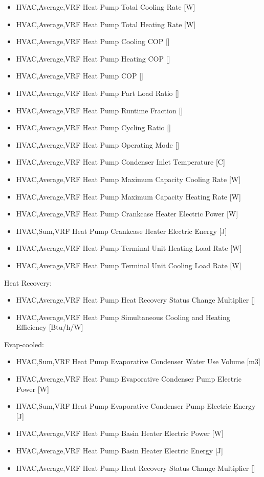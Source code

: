 \begin{itemize}
\item
  HVAC,Average,VRF Heat Pump Total Cooling Rate {[}W{]}
\item
  HVAC,Average,VRF Heat Pump Total Heating Rate {[}W{]}
\item
  HVAC,Average,VRF Heat Pump Cooling COP {[]}
\item
  HVAC,Average,VRF Heat Pump Heating COP {[]}
\item
  HVAC,Average,VRF Heat Pump COP {[]}
\item
  HVAC,Average,VRF Heat Pump Part Load Ratio {[]}
\item
  HVAC,Average,VRF Heat Pump Runtime Fraction {[]}
\item
  HVAC,Average,VRF Heat Pump Cycling Ratio {[]}
\item
  HVAC,Average,VRF Heat Pump Operating Mode {[]}
\item
  HVAC,Average,VRF Heat Pump Condenser Inlet Temperature {[}C{]}
\item
  HVAC,Average,VRF Heat Pump Maximum Capacity Cooling Rate {[}W{]}
\item
  HVAC,Average,VRF Heat Pump Maximum Capacity Heating Rate {[}W{]}
\item
  HVAC,Average,VRF Heat Pump Crankcase Heater Electric Power {[}W{]}
\item
  HVAC,Sum,VRF Heat Pump Crankcase Heater Electric Energy {[}J{]}
\item
  HVAC,Average,VRF Heat Pump Terminal Unit Heating Load Rate {[}W{]}
\item
  HVAC,Average,VRF Heat Pump Terminal Unit Cooling Load Rate {[}W{]}
\end{itemize}

Heat Recovery:

\begin{itemize}
\item
  HVAC,Average,VRF Heat Pump Heat Recovery Status Change Multiplier {[]}
\item
  HVAC,Average,VRF Heat Pump Simultaneous Cooling and Heating Efficiency {[}Btu/h/W{]}
\end{itemize}

Evap-cooled:

\begin{itemize}
\item
  HVAC,Sum,VRF Heat Pump Evaporative Condenser Water Use Volume {[}m3{]}
\item
  HVAC,Average,VRF Heat Pump Evaporative Condenser Pump Electric Power {[}W{]}
\item
  HVAC,Sum,VRF Heat Pump Evaporative Condenser Pump Electric Energy {[}J{]}
\item
  HVAC,Average,VRF Heat Pump Basin Heater Electric Power {[}W{]}
\item
  HVAC,Average,VRF Heat Pump Basin Heater Electric Energy {[}J{]}
\item
  HVAC,Average,VRF Heat Pump Heat Recovery Status Change Multiplier {[]}
\end{itemize}

